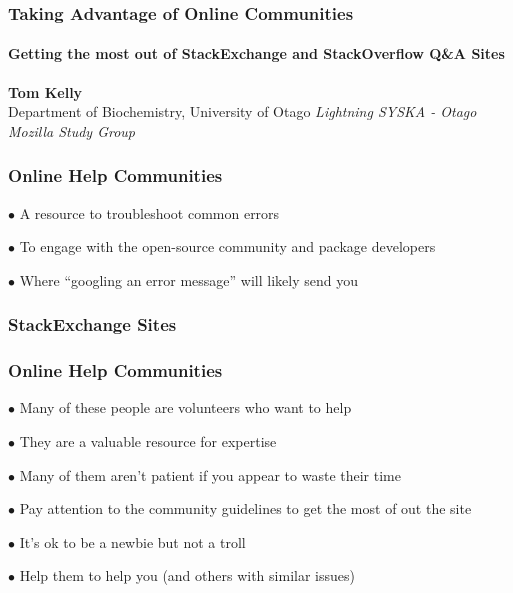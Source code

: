 \documentclass{beamer}
\begin{document}
\begin{frame}
    \frametitle{Taking Advantage of Online Communities}
    \framesubtitle{Getting the most out of StackExchange and StackOverflow Q&A Sites}
    
    
    \begin{center}
      \textbf{Tom Kelly} \\
      Department of Biochemistry, University of Otago
      \newline
      \newline
      \textit{Lightning SYSKA - Otago Mozilla Study Group}
    \end{center}        

  \end{frame}
  \begin{frame}
    \frametitle{Online Help Communities}
        
      $\bullet$ A resource to troubleshoot common errors
      
      $\bullet$ To engage with the open-source community and package developers
      
      $\bullet$ Where ``googling an error message'' will likely send you
      
  \end{frame}
  \begin{frame}
    \frametitle{StackExchange Sites}
    
    \begin{center}
     
      
    \end{center}  
  \end{frame}
    \begin{frame}
    \frametitle{Online Help Communities}
        
      $\bullet$ Many of these people are volunteers who want to help
      
      $\bullet$ They are a valuable resource for expertise
      
      $\bullet$ Many of them aren't patient if you appear to waste their time
      
      $\bullet$ Pay attention to the community guidelines to get the most of out the site

      $\bullet$ It's ok to be a newbie but not a troll
      
      $\bullet$ Help them to help you (and others with similar issues)
            
  \end{frame}
\end{document}
